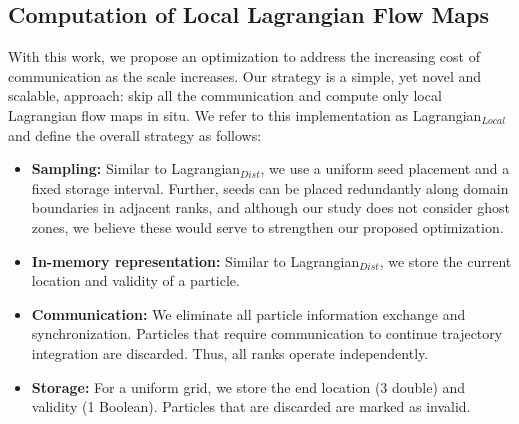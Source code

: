 \subsection{Computation of Local Lagrangian Flow Maps}
\label{sec:local}
%
%
%
%
%
With this work, we propose an optimization to address the increasing cost of communication as the scale increases.
%
Our strategy is a simple, yet novel and scalable, approach: skip all the communication and compute only local Lagrangian flow maps in situ. 
%
We refer to this implementation as Lagrangian$_{Local}$ and define the overall strategy as follows:
\begin{itemize}[leftmargin=*]
\item\textbf{Sampling:} Similar to Lagrangian$_{Dist}$, we use a uniform seed placement and a fixed storage interval.
%
Further, seeds can be placed redundantly along domain boundaries in adjacent ranks, and although our study does not consider ghost zones, we believe these would serve to strengthen our proposed optimization.
%
\item\textbf{In-memory representation:} Similar to Lagrangian$_{Dist}$, we store the current location and validity of a particle.
%
\item\textbf{Communication:} We eliminate all particle information exchange and synchronization. Particles that require communication to continue trajectory integration are discarded. Thus, all ranks operate independently.
%
\item\textbf{Storage:} For a uniform grid, we store the end location (3 double) and validity (1 Boolean). Particles that are discarded are marked as invalid. 
%
\end{itemize}

